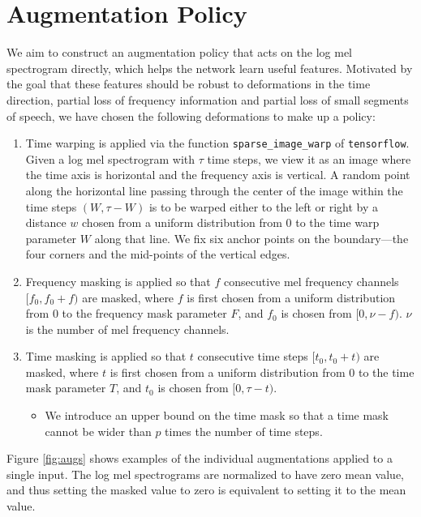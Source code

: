 \section{Augmentation Policy}

We aim to construct an augmentation policy that acts on the log mel spectrogram directly, which helps the network learn useful features. Motivated by the goal that these features should be robust to deformations in the time direction, partial loss of frequency information and partial loss of small segments of speech, we have chosen the following deformations to make up a policy:
\begin{enumerate}
\item Time warping is applied via the function {\tt sparse\_image\_warp} of {\tt tensorflow}. Given a log mel spectrogram with $\tau$ time steps, we view it as an image where the time axis is horizontal and the frequency axis is vertical. A random point along the horizontal line passing through the center of the image within the time steps $(W, \tau-W)$ is to be warped either to the left or right by a distance $w$ chosen from a uniform distribution from 0 to the time warp parameter $W$ along that line.  We fix six anchor points on the boundary---the four corners and the mid-points of the vertical edges.
\item Frequency masking is applied so that $f$ consecutive mel frequency channels $[f_0, f_0 + f)$ are masked, where $f$ is first chosen from a uniform distribution from 0 to the frequency mask parameter $F$, and $f_0$ is chosen from $[0, \nu -f)$. $\nu$ is the number of mel frequency channels.
\item Time masking is applied so that $t$ consecutive time steps $[t_0, t_0 + t)$ are masked, where $t$ is first chosen from a uniform distribution from 0 to the time mask parameter $T$, and $t_0$ is chosen from $[0, \tau-t)$.
 \begin{itemize}
 \item We introduce an upper bound on the time mask so that a time mask cannot be wider than $p$ times the number of time steps.
 \end{itemize}
\end{enumerate}
Figure \ref{fig:augs} shows examples of the individual augmentations applied to a single input. The log mel spectrograms are normalized to have zero mean value, and thus setting the masked value to zero is equivalent to setting it to the mean value.

